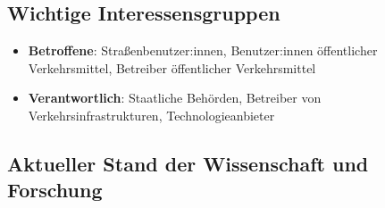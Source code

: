 \documentclass[
]{book}
\providecommand{\tightlist}{%
  \setlength{\itemsep}{0pt}\setlength{\parskip}{0pt}}
\begin{document}
\hypertarget{wichtige-interessensgruppen-5}{%
\subsection*{Wichtige Interessensgruppen}\label{wichtige-interessensgruppen-5}}

\begin{itemize}
\tightlist
\item
  \textbf{Betroffene}: Straßenbenutzer:innen, Benutzer:innen öffentlicher Verkehrsmittel, Betreiber öffentlicher Verkehrsmittel
\item
  \textbf{Verantwortlich}: Staatliche Behörden, Betreiber von Verkehrsinfrastrukturen, Technologieanbieter
\end{itemize}

\hypertarget{aktueller-stand-der-wissenschaft-und-forschung-5}{%
\subsection*{Aktueller Stand der Wissenschaft und Forschung}\label{aktueller-stand-der-wissenschaft-und-forschung-5}}
\end{document}
